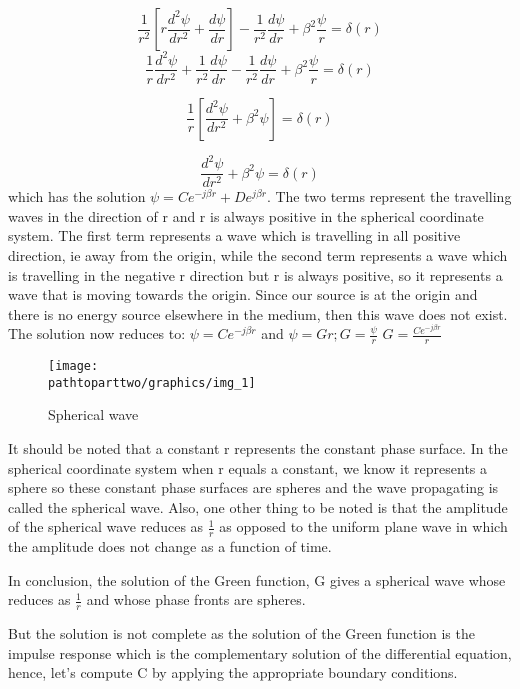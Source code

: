 $$\frac{1}{r^{2}}[r\frac{d^{2}\psi}{dr^{2}} + \frac{d\psi}{dr}] - \frac{1}{r^{2}}\frac{d\psi}{dr} + \beta^{2}\frac{\psi}{r} = \delta(r)$$
$$\frac{1}{r}\frac{d^{2}\psi}{dr^{2}} + \frac{1}{r^{2}}\frac{d\psi}{dr} - \frac{1}{r^{2}}\frac{d\psi}{dr} + \beta^{2}\frac{\psi}{r} = \delta(r)$$

$$\frac{1}{r}[\frac{d^{2}\psi}{dr^{2}} + \beta^{2}\psi] = \delta(r)$$

$$\frac{d^{2}\psi}{dr^{2}} + \beta^{2}\psi = \delta(r)$$
which has the solution $\psi = Ce^{-j\beta r} + De^{j\beta r}$. The two terms represent the travelling waves in the direction of r and r is always positive in the spherical  coordinate system. The first term represents a wave which is travelling in all positive direction, ie away from the origin, while the second term represents a wave which is travelling in the negative r direction but r is always positive, so it represents a wave that is moving towards the origin. Since our source is at the origin and there is no energy source elsewhere in the medium, then this wave does not exist. The solution now reduces to:
$\psi = Ce^{-j\beta r}$ and $\psi = Gr; G = \frac{\psi}{r}$
$G = \frac{Ce^{-j\beta r}}{r}$
\begin{figure}[h]
\centering
\texttt{[image: \\pathtoparttwo/graphics/img\_1]}
\caption{Spherical wave}
\label{fig:1}
\end{figure}
It should be noted that a constant r represents the constant phase surface. In the spherical coordinate system when r equals a constant, we know it represents a sphere so these constant phase surfaces are spheres and the wave propagating is called the spherical wave. Also, one other thing to be noted is that the amplitude of the spherical wave reduces as $\frac{1}{r}$ as opposed to the uniform  plane wave in which the amplitude does not change as a function of time.

In conclusion, the solution of the Green function, G gives a spherical wave whose  reduces as  $\frac{1}{r}$ and whose phase fronts are spheres.

But the solution is not complete as the solution of the Green function is the impulse response which is the complementary solution  of the differential equation, hence, let's compute C by applying the appropriate boundary conditions.

